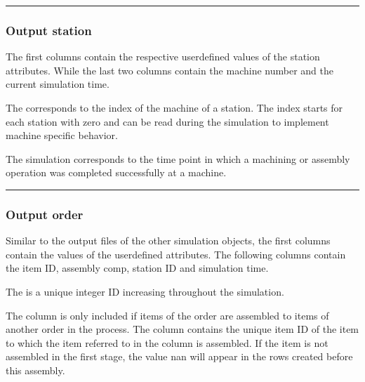 \documentclass[letterpaper,10pt,english]{sphinxmanual}
\begin{document}
\bigskip\hrule\bigskip



\subsubsection{Output station}
\label{\detokenize{source/Interface_files/output_file:output-station}}\label{\detokenize{source/Interface_files/output_file:id2}}
\sphinxAtStartPar
The first columns contain the respective user\sphinxhyphen{}defined values of the station attributes. While the last two columns
contain the machine number and the current simulation time.


\sphinxAtStartPar
The  corresponds to the index of the machine of a station. The index starts for each station with
zero and can be read during the simulation to implement machine specific behavior.

\sphinxAtStartPar
The simulation  corresponds to the time point in which a machining or assembly operation was completed
successfully at a machine.


\bigskip\hrule\bigskip



\subsubsection{Output order}
\label{\detokenize{source/Interface_files/output_file:output-order}}\label{\detokenize{source/Interface_files/output_file:id3}}
\sphinxAtStartPar
Similar to the output files of the other simulation objects, the first columns contain the values of the user\sphinxhyphen{}defined
attributes. The following columns contain the item ID, assembly comp, station ID and simulation time.


\sphinxAtStartPar
The  is a unique integer ID increasing throughout the simulation.

\sphinxAtStartPar
The column  is only included if items of the order are assembled to items of another order in the process. The
column contains the unique item ID of the item to which the item referred to in the column is assembled.  If the item
is not assembled in the first stage, the value nan will appear in the rows created before this assembly.
\end{document}

